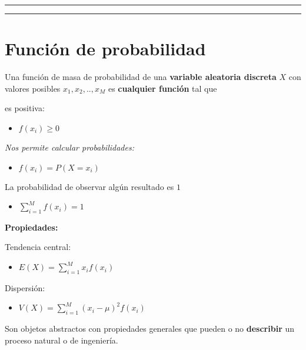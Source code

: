 \documentclass[
]{book}
\providecommand{\tightlist}{%
  \setlength{\itemsep}{0pt}\setlength{\parskip}{0pt}}
\begin{document}
\begin{center}\rule{0.5\linewidth}{0.5pt}\end{center}

\begin{center}\rule{0.5\linewidth}{0.5pt}\end{center}

\hypertarget{funciuxf3n-de-probabilidad}{%
\section{Función de probabilidad}\label{funciuxf3n-de-probabilidad}}

Una función de masa de probabilidad de una \textbf{variable aleatoria discreta} \(X\) con valores posibles \(x_1 , x_2 , .. , x_M\) es \textbf{cualquier función} tal que

es positiva:

\begin{itemize}
\tightlist
\item
  \(f(x_i)\geq 0\)
\end{itemize}

\emph{Nos permite calcular probabilidades:}

\begin{itemize}
\tightlist
\item
  \(f(x_i)=P(X=x_i)\)
\end{itemize}

La probabilidad de observar algún resultado es \(1\)

\begin{itemize}
\tightlist
\item
  \(\sum_{i=1}^M f(x_i)=1\)
\end{itemize}

\textbf{Propiedades:}

Tendencia central:

\begin{itemize}
\tightlist
\item
  \(E(X)= \sum_{i=1}^M x_i f(x_i)\)
\end{itemize}

Dispersión:

\begin{itemize}
\tightlist
\item
  \(V(X)= \sum_{i=1}^M (x_i-\mu)^2 f(x_i)\)
\end{itemize}

Son objetos abstractos con propiedades generales que pueden o no \textbf{describir} un proceso natural o de ingeniería.
\end{document}

